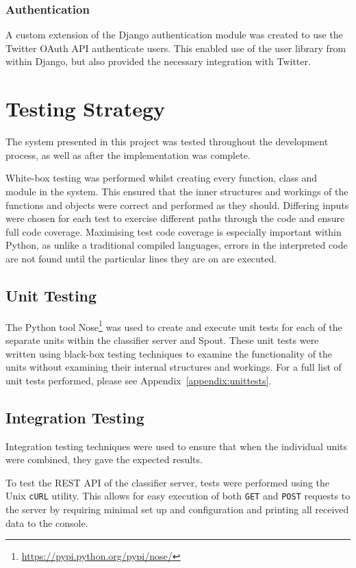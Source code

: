 \documentclass[11pt,a4paper]{report}
\begin{document}
\subsection{Authentication}
A custom extension of the Django authentication module was created to use the Twitter OAuth API authenticate users. This enabled use of the user library from within Django, but also provided the necessary integration with Twitter.

\pagebreak

\chapter{Testing Strategy}
\label{chap:testing}

The system presented in this project was tested throughout the development process, as well as after the implementation was complete.

White-box testing was performed whilst creating every function, class and module in the system. This ensured that the inner structures and workings of the functions and objects were correct and performed as they should. Differing inputs were chosen for each test to exercise different paths through the code and ensure full code coverage. Maximising test code coverage is especially important within Python, as unlike a traditional compiled languages, errors in the interpreted code are not found until the particular lines they are on are executed.

\section{Unit Testing}

The Python tool Nose\footnote{\url{https://pypi.python.org/pypi/nose/}} was used to create and execute unit tests for each of the separate units within the classifier server and Spout. These unit tests were written using black-box testing techniques to examine the functionality of the units without examining their internal structures and workings. For a full list of unit tests performed, please see Appendix~\ref{appendix:unittests}.

\section{Integration Testing}
Integration testing techniques were used to ensure that when the individual units were combined, they gave the expected results.

To test the REST API of the classifier server, tests were performed using the Unix \verb+cURL+ utility. This allows for easy execution of both \texttt{GET} and \texttt{POST} requests to the server by requiring minimal set up and configuration and printing all received data to the console.
\end{document}
